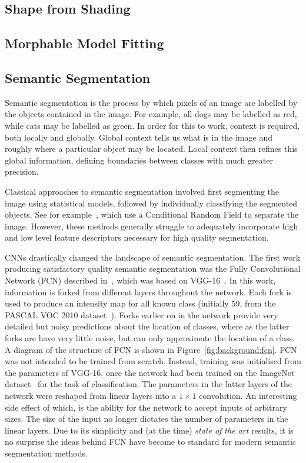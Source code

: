 \subsection{Shape from Shading}

\subsection{Morphable Model Fitting}

\subsection{Semantic Segmentation}

Semantic segmentation is the process by which pixels of an image are
labelled by the objects contained in the image. For example, all dogs
may be labelled as red, while cats may be labelled as green. In order
for this to work, context is required, both locally and
globally. Global context tells us what is in the image and roughly
where a particular object may be located. Local context then refines
this global information, defining boundaries between classes with much
greater precision.

Classical approaches to semantic segmentation involved first
segmenting the image using statistical models, followed by
individually classifying the segmented objects. See for
example~\cite{arbelaez2012semantic,carreira2012semantic}, which use a
Conditional Random Field to separate the image. However, these methods
generally struggle to adequately incorporate high and low level
feature descriptors necessary for high quality segmentation.

CNNs drastically changed the landscape of semantic segmentation. The
first work producing satisfactory quality semantic segmentation was
the Fully Convolutional Network (FCN) described
in~\cite{long2015fully}, which was based on
VGG-16~\cite{simonyan2014vgg}. In this work, information is forked
from different layers throughout the network. Each fork is used to
produce an intensity map for all known class (initially 59, from the
PASCAL VOC 2010 dataset~\cite{everingham2010pascal}). Forks earlier on
in the network provide very detailed but noisy predictions about the
location of classes, where as the latter forks are have very little
noise, but can only approximate the location of a class. A diagram of
the structure of FCN is shown in Figure~\ref{fig:background:fcn}. FCN
was not intended to be trained from scratch. Instead, training was
initialised from the parameters of VGG-16, once the network had been
trained on the ImageNet dataset~\cite{krizhevsky2012imagenet} for the
task of classification. The parameters in the latter layers of the
network were reshaped from linear layers into a $1\times 1$
convolution. An interesting side effect of which, is the ability for
the network to accept inputs of arbitrary sizes. The size of the input
no longer dictates the number of parameters in the linear layers. Due
to its simplicity and (at the time) \textit{state of the art} results,
it is no surprise the ideas behind FCN have become to standard for
modern semantic segmentation methods.

